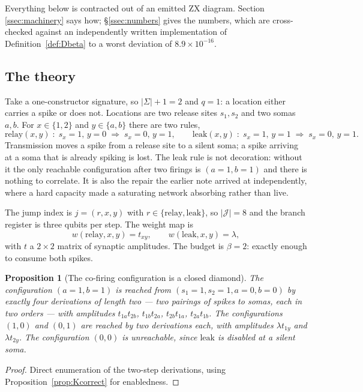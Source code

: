 \documentclass[11pt]{article}
\theoremstyle{definition}
\theoremstyle{plain}
\newtheorem{proposition}[definition]{Proposition}
\newcommand{\rew}{\Rightarrow}
\newcommand{\Tags}{\Sigma}
\newcommand{\Jumps}{\mathcal{J}}
\begin{document}
Everything below is contracted out of an emitted ZX diagram. Section
\ref{ssec:machinery} says how; \S\ref{ssec:numbers} gives the numbers, which are
cross-checked against an independently written implementation of
Definition~\ref{def:Dbeta} to a worst deviation of $8.9\times 10^{-16}$.

\subsection{The theory}\label{ssec:theory}

Take a one-constructor signature, so $|\Tags| + 1 = 2$ and $q = 1$: a location
either carries a spike or does not. Locations are two release sites $s_1, s_2$
and two somas $a, b$. For $x \in \{1,2\}$ and $y \in \{a,b\}$ there are two
rules,
\[
  \mathrm{relay}(x,y) \;:\; s_x{=}1,\, y{=}0 \;\rew\; s_x{=}0,\, y{=}1,
  \qquad
  \mathrm{leak}(x,y) \;:\; s_x{=}1,\, y{=}1 \;\rew\; s_x{=}0,\, y{=}1 .
\]
Transmission moves a spike from a release site to a silent soma; a spike
arriving at a soma that is already spiking is lost. The leak rule is not
decoration: without it the only reachable configuration after two firings is
$(a{=}1, b{=}1)$ and there is nothing to correlate. It is also the repair the
earlier note arrived at independently, where a hard capacity made a saturating
network absorbing rather than live.

The jump index is $j = (r,x,y)$ with $r \in \{\mathrm{relay},\mathrm{leak}\}$,
so $|\Jumps| = 8$ and the branch register is three qubits per step. The weight
map is
\[
  w(\mathrm{relay}, x, y) = t_{xy}, \qquad w(\mathrm{leak}, x, y) = \lambda ,
\]
with $t$ a $2\times 2$ matrix of synaptic amplitudes. The budget is $\beta = 2$:
exactly enough to consume both spikes.

\begin{proposition}[The co-firing configuration is a closed diamond]\label{prop:cofire}
The configuration $(a{=}1, b{=}1)$ is reached from $(s_1{=}1, s_2{=}1, a{=}0,
b{=}0)$ by exactly four derivations of length two --- two pairings of spikes to
somas, each in two orders --- with amplitudes
$t_{1a}t_{2b}$, $t_{1b}t_{2a}$, $t_{2b}t_{1a}$, $t_{2a}t_{1b}$.
The configurations $(1,0)$ and $(0,1)$ are reached by two derivations each,
with amplitudes $\lambda t_{1y}$ and $\lambda t_{2y}$. The configuration
$(0,0)$ is unreachable, since $\mathrm{leak}$ is disabled at a silent soma.
\end{proposition}

\begin{proof}
Direct enumeration of the two-step derivations, using
Proposition~\ref{prop:Kcorrect} for enabledness.
\end{proof}
\end{document}
